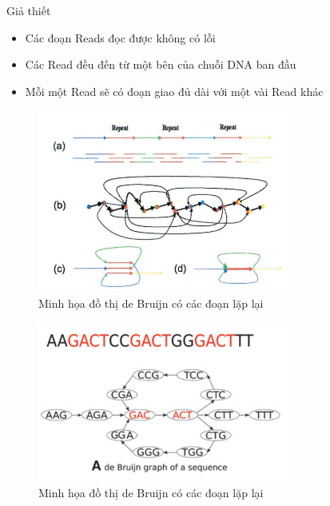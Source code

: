 \documentclass[10pt]{beamer}
\theoremstyle{remark}
\numberwithin{algocf}{section}
\numberwithin{equation}{section}
\numberwithin{dl}{section}
\numberwithin{figure}{section}
\begin{document}
\begin{frame}{Giả thiết}
    \begin{itemize}
        \item Các đoạn Reads đọc được không có lỗi
        \item Các Read đều đến từ một bên của chuỗi DNA ban đầu
        \item Mỗi một Read sẽ có đoạn giao đủ dài với một vài Read khác
    \end{itemize}
\end{frame}

\begin{frame}
    \begin{figure}[h!]
        \centering
        \includegraphics[width=0.75\textwidth]{figures/de_Bruijn_graph_with_repeat_1.png}
        \caption{Minh họa đồ thị de Bruijn có các đoạn lặp lại}
    \end{figure}
\end{frame}

\begin{frame}
    \begin{figure}[h!]
        \centering
        \includegraphics[width=0.75\textwidth]{figures/de_Bruijn_graph_with_repeat_2.png}
        \caption{Minh họa đồ thị de Bruijn có các đoạn lặp lại}
    \end{figure}
\end{frame}
\end{document}
